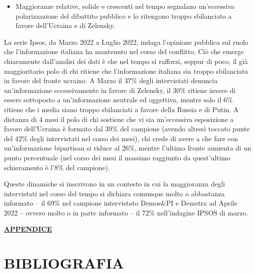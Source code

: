 \documentclass[
  openany]{book}
\providecommand{\tightlist}{%
  \setlength{\itemsep}{0pt}\setlength{\parskip}{0pt}}
\begin{document}
\begin{itemize}
\tightlist
\item
  Maggioranze relative, solide e crescenti nel tempo segnalano un'eccessiva polarizzazione del dibattito pubblico e lo ritengono troppo sbilanciato a favore dell'Ucraina e di Zelensky.
\end{itemize}

La serie Ipsos, da Marzo 2022 a Luglio 2022, indaga l'opinione pubblica sul ruolo che l'informazione italiana ha mantenuto nel corso del conflitto. Ciò che emerge chiaramente dall'analisi dei dati è che nel tempo si rafforzi, seppur di poco, il già maggioritario polo di chi ritiene che l'informazione italiana sia troppo sbilanciata in favore del fronte ucraino. A Marzo il 37\% degli intervistati denuncia un'informazione eccessivamente in favore di Zelensky, il 30\% ritiene invece di essere sottoposto a un'informazione neutrale ed oggettiva, mentre solo il 6\% ritiene che i media siano troppo sbilanciati a favore della Russia e di Putin. A distanza di 4 mesi il polo di chi sostiene che vi sia un'eccessiva esposizione a favore dell'Ucraina è formato dal 39\% del campione (avendo altresì toccato punte del 42\% degli intervistati nel corso dei mesi), chi crede di avere a che fare con un'informazione bipartisan si riduce al 26\%, mentre l'ultimo fronte aumenta di un punto percentuale (nel corso dei mesi il massimo raggiunto da quest'ultimo schieramento è l'8\% del campione).

Queste dinamiche si inscrivono in un contesto in cui la maggioranza degli intervistati nel corso del tempo si dichiara comunque molto o abbastanza informato -- il 69\% nel campione intervistato Demos\&PI e Demetra ad Aprile 2022 -- ovvero molto o in parte informato -- il 72\% nell'indagine IPSOS di marzo.

\href{https://github.com/LucianaFazio/Ucrania/blob/main/PDF_Appendice/VIII.\%20Ruolo\%20dei\%20media.pdf}{\textbf{APPENDICE}}

\hypertarget{bibliografia}{%
\chapter*{BIBLIOGRAFIA}\label{bibliografia}}

  
\end{document}
